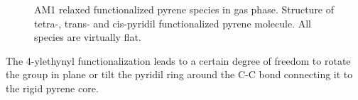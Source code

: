 \begin{figure}[h!] \centering
{}
	\caption{AM1 relaxed functionalized pyrene species in gas phase. Structure of  tetra-,  trans- and  cis-pyridil functionalized pyrene molecule. All species are virtually flat.}
	\label{fig:pyrene-fig1}
\end{figure}

The 4-ylethynyl functionalization leads to a certain degree of freedom to rotate the group in plane or tilt the pyridil ring around the C-C bond connecting it to the rigid pyrene core.


